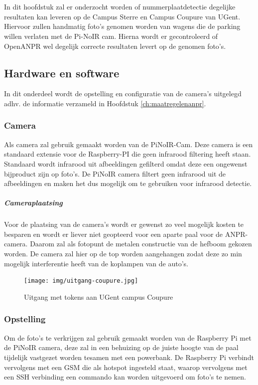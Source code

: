 
\chapter{}
\label{ch:praktischeUitvoering}
In dit hoofdstuk zal er onderzocht worden of nummerplaatdetectie degelijke resultaten kan leveren op de Campus Sterre en Campus Coupure van UGent. Hiervoor zullen handmatig foto's genomen worden van wagens die de parking willen verlaten met de Pi-NoIR cam. Hierna wordt er gecontroleerd of OpenANPR wel degelijk correcte resultaten levert op de genomen foto's.


\section{Hardware en software}
In dit onderdeel wordt de opstelling en configuratie van de camera's uitgelegd adhv. de informatie verzameld in Hoofdstuk \ref{ch:maatregelenanpr}.

\subsection{Camera}
Als camera zal gebruik gemaakt worden van de PiNoIR-Cam. Deze camera is een standaard extensie voor de Raspberry-PI die geen infrarood filtering heeft staan. Standaard wordt infrarood uit afbeeldingen gefilterd omdat deze een ongewenst bijproduct zijn op foto's. De PiNoIR camera filtert geen infrarood uit de afbeeldingen en maken het dus mogelijk om te gebruiken voor infrarood detectie.

\paragraph{Cameraplaatsing}
Voor de plaatsing van de camera's wordt er gewenst zo veel mogelijk kosten te besparen en wordt er liever niet geopteerd voor een aparte paal voor de ANPR-camera. Daarom zal als fotopunt de metalen constructie van de hefboom gekozen worden. De camera zal hier op de top worden aangehangen zodat deze zo min mogelijk interferentie heeft van de koplampen van de auto's.

\begin{figure}[h!]
	\centering
	\texttt{[image: img/uitgang-coupure.jpg]}
	\caption{Uitgang met tokens aan UGent campus Coupure}
\end{figure}

\subsection{Opstelling}
Om de foto's te verkrijgen zal gebruik gemaakt worden van de Raspberry Pi met de PiNoIR camera, deze zal in een behuizing op de juiste hoogte van de paal tijdelijk vastgezet worden tesamen met een powerbank. De Raspberry Pi verbindt vervolgens met een GSM die als hotspot ingesteld staat, waarop vervolgens met een SSH verbinding een commando kan worden uitgevoerd om foto's te nemen.

